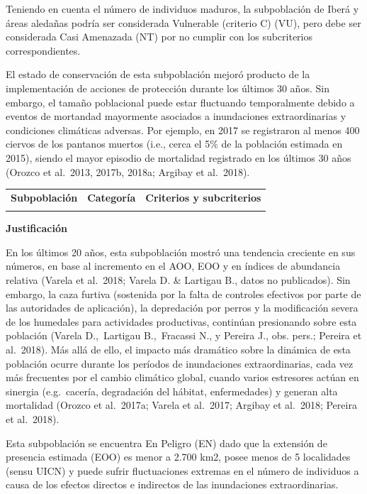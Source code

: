 \documentclass[
]{article}
\begin{document}
Teniendo en cuenta el número de individuos maduros, la subpoblación de
Iberá y áreas aledañas podría ser considerada Vulnerable (criterio C)
(VU), pero debe ser considerada Casi Amenazada (NT) por no cumplir con
los subcriterios correspondientes.

El estado de conservación de esta subpoblación mejoró producto de la
implementación de acciones de protección durante los últimos 30 años.
Sin embargo, el tamaño poblacional puede estar fluctuando temporalmente
debido a eventos de mortandad mayormente asociados a inundaciones
extraordinarias y condiciones climáticas adversas. Por ejemplo, en 2017
se registraron al menos 400 ciervos de los pantanos muertos (i.e., cerca
el 5\% de la población estimada en 2015), siendo el mayor episodio de
mortalidad registrado en los últimos 30 años (Orozco et al.~2013, 2017b,
2018a; Argibay et al.~2018).\vspace{0.5cm}

\begin{tabu} to 
\toprule
\textbf{Subpoblación} & \textbf{Categoría} & \textbf{Criterios y subcriterios}\\
\midrule
{} &  & \\
\bottomrule
\end{tabu}

\textbf{Justificación}

En los últimos 20 años, esta subpoblación mostró una tendencia creciente
en sus números, en base al incremento en el AOO, EOO y en índices de
abundancia relativa (Varela et al.~2018; Varela D. \& Lartigau B., datos
no publicados). Sin embargo, la caza furtiva (sostenida por la falta de
controles efectivos por parte de las autoridades de aplicación), la
depredación por perros y la modificación severa de los humedales para
actividades productivas, continúan presionando sobre esta población
(Varela D.,~Lartigau B.,~Fracassi N., y Pereira J., obs. pers.; Pereira
et al.~2018). Más allá de ello, el impacto más dramático sobre la
dinámica de esta población ocurre durante los períodos de inundaciones
extraordinarias, cada vez más frecuentes por el cambio climático global,
cuando varios estresores actúan en sinergia (e.g.~cacería, degradación
del hábitat, enfermedades) y generan alta mortalidad (Orozco et
al.~2017a; Varela et al.~2017; Argibay et al.~2018; Pereira et
al.~2018).

Esta subpoblación se encuentra En Peligro (EN) dado que la extensión de
presencia estimada (EOO) es menor a 2.700 km2, posee menos de 5
localidades (sensu UICN) y puede sufrir fluctuaciones extremas en el
número de individuos a causa de los efectos directos e indirectos de las
inundaciones extraordinarias.\vspace{0.5cm}
\end{document}
